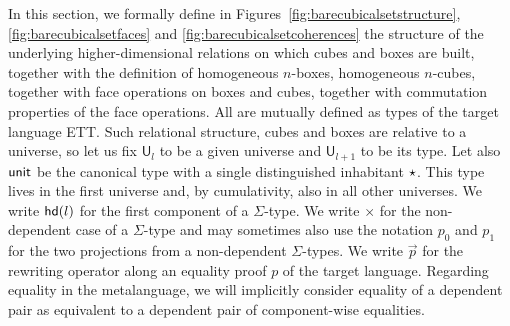 \documentclass{article}
\newcommand{\sort}[1]{\mathsf{U}_{#1}}
\begin{document}
In this section, we formally define in
Figures~\ref{fig:barecubicalsetstructure},
\ref{fig:barecubicalsetfaces} and \ref{fig:barecubicalsetcoherences}
the structure of the underlying higher-dimensional relations on which
cubes and boxes are built, together with the definition of homogeneous
$n$-boxes, homogeneous $n$-cubes, together with face operations on
boxes and cubes, together with commutation properties of the face
operations. All are mutually defined as types of the target language
ETT. Such relational structure, cubes and boxes are relative to a
universe, so let us fix $\sort{l}$ to be a given universe and
$\sort{l+1}$ to be its type. Let also $\mathsf{unit}$ be the canonical
type with a single distinguished inhabitant $\star$. This type
lives in the first universe and, by cumulativity, also in all other
universes. We write $\mathsf{hd}(l)$ for the first component of a
$\Sigma$-type. We write $\times$ for the non-dependent case of a 
$\Sigma$-type and may sometimes also use the notation $p_0$ and $p_1$
for the two projections from a non-dependent $\Sigma$-types. We write
$\overrightarrow{p}$ for the rewriting operator along an equality
proof $p$ of the target language. Regarding equality in the
metalanguage, we will implicitly consider equality of a dependent pair
as equivalent to a dependent pair of component-wise equalities.
\end{document}

